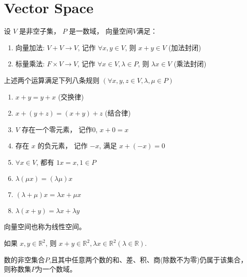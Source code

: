 \section{Vector Space}

\begin{definition}[向量空间$V$]
    设 $  V  $ 是非空子集， $  P  $ 是一数域， 向量空间$V$满足：

    \begin{enumerate}
        \item 向量加法: $  V+V \rightarrow V  $, 记作 $  \forall x, y \in V  $, 则 $  x+y \in V  $ (加法封闭)
        \item 标量乘法: $  F \times V \rightarrow V  $, 记作 $  \forall x \in V, \lambda \in P  $, 则 $  \lambda x \in V  $ (乘法封闭)
    \end{enumerate}


\end{definition}

\begin{theorem}
    上述两个运算满足下列八条规则 $  (\forall x, y, z \in V, \lambda, \mu \in P)  $ 
\begin{enumerate}
    \item $  x+y=y+x  $ (交换律) 
    \item $  x+(y+z)=(x+y)+z  $ (结合律)
    \item $  V  $ 存在一个零元素， 记作$0$, $  x+0=x  $
    \item 存在 $  x  $ 的负元素， 记作 $  -x  $, 满足 $  x+(-x)=0  $
    \item $  \forall x \in V  $, 都有 $  1 x=x, 1 \in P  $
    \item $  \lambda(\mu x)=(\lambda \mu) x  $
    \item $  (\lambda+\mu) x=\lambda x+\mu x  $
    \item $   \lambda(x+y)=\lambda x+\lambda y  $
\end{enumerate}
\end{theorem}

\begin{corollary}
    向量空间也称为线性空间。
\end{corollary}

\begin{corollary}
    如果 $  x, y \in \mathbb{R}^{2}  $, 则 $  x+y \in \mathbb{R}^{2}, \lambda x \in \mathbb{R}^{2}(\lambda \in \mathbb{R})  $.
\end{corollary}

\begin{definition}[数域]
    数的非空集合$P$,且其中任意两个数的和、差、积、商(除数不为零)仍属于该集合， 则称数集$P$为一个数域。 
\end{definition}

